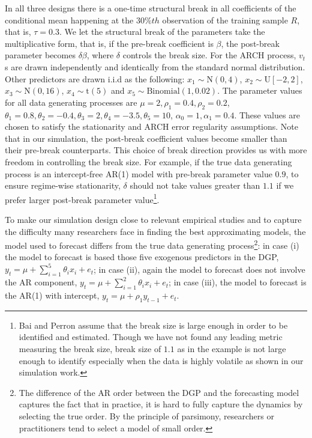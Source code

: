 In all three designs there is a one-time structural break in all coefficients of the conditional mean happening at the $30\%th$ observation of the training sample $R$, that is, $\tau = 0.3$. We let the structural break of the parameters take the multiplicative form, that is, if the pre-break coefficient is $\beta$, the post-break parameter becomes $\delta\beta$, where $\delta$ controls the break size. For the ARCH process, $v_{t}$s are drawn independently and identically from the standard normal distribution. Other predictors are drawn i.i.d as the following: $x_{1} \sim \mathrm{N}(0,4)$, $x_{2} \sim \mathrm{U}[-2,2]$, $x_{3} \sim \mathrm{N}(0,16)$, $x_{4} \sim \mathrm{t}(5)$ and $x_{5} \sim \mathrm{Binomial}(1,0.02)$. The parameter values for all data generating processes are $\mu = 2, \rho_{1} = 0.4, \rho_{2} = 0.2$, $\theta_{1} = 0.8,\theta_{2} = -0.4,\theta_{3} = 2,\theta_{4} = -3.5,\theta_{5} = 10$, $\alpha_{0} = 1, \alpha_{1} = 0.4$. These values are chosen to satisfy the stationarity and ARCH error regularity assumptions. Note that in our simulation, the post-break coefficient values become smaller than their pre-break counterparts. This choice of break direction provides us with more freedom in controlling the break size. For example, if the true data generating process is an intercept-free AR(1) model with pre-break parameter value $0.9$, to ensure regime-wise stationarity, $\delta$ should not take values greater than $1.1$ if we prefer larger post-break parameter value\footnote{Bai and Perron \cite{bai_perron98} assume that the break size is large enough in order to be identified and estimated. Though we have not found any leading metric measuring the break size, break size of $1.1$ as in the example is not large enough to identify especially when the data is highly volatile as shown in our simulation work.}.

To make our simulation design close to relevant empirical studies and to capture the difficulty many researchers face in finding the best approximating models, the model used to forecast differs from the true data generating process\footnote{The difference of the AR order between the DGP and the forecasting model captures the fact that in practice, it is hard to fully capture the dynamics by selecting the true order. By the principle of parsimony, researchers or practitioners tend to select a model of small order.}: in case (i) the model to forecast is based those five exogenous predictors in the DGP, $y_{t} = \mu + \sum_{i=1}^{5}\theta_{i}x_{i} + e_{t}$; in case (ii), again the model to forecast does not involve the AR component, $y_{t} = \mu + \sum_{i=1}^{2}\theta_{i}x_{i} + e_{t}$; in case (iii), the model to forecast is the AR(1) with intercept, $y_{t} = \mu + \rho_{1}y_{t-1} + e_{t}$.


